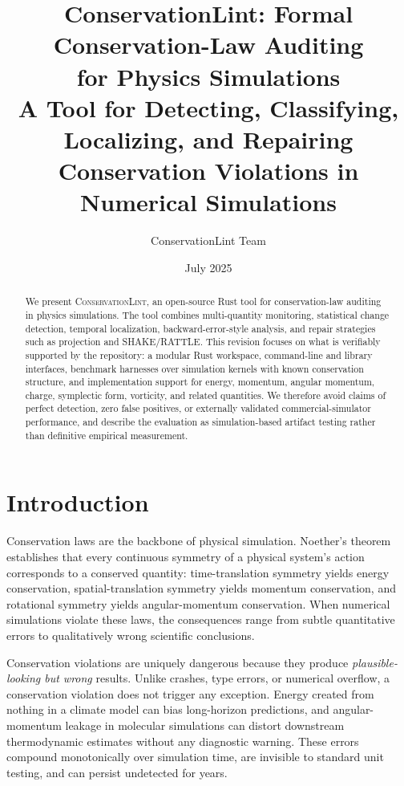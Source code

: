 \documentclass[11pt,a4paper]{article}
\title{\textbf{ConservationLint: Formal Conservation-Law Auditing\\for Physics Simulations}\\[0.5em]
\large A Tool for Detecting, Classifying, Localizing, and Repairing\\
Conservation Violations in Numerical Simulations}
\author{ConservationLint Team}
\date{July 2025}
\begin{document}
\maketitle

\begin{abstract}
We present \textsc{ConservationLint}, an open-source Rust tool for
conservation-law auditing in physics simulations.  The tool combines
multi-quantity monitoring, statistical change detection, temporal
localization, backward-error-style analysis, and repair strategies such
as projection and SHAKE/RATTLE.  This revision focuses on what is
verifiably supported by the repository: a modular Rust workspace,
command-line and library interfaces, benchmark harnesses over
simulation kernels with known conservation structure, and implementation
support for energy, momentum, angular momentum, charge, symplectic
form, vorticity, and related quantities.  We therefore avoid claims of
perfect detection, zero false positives, or externally validated
commercial-simulator performance, and describe the evaluation as
simulation-based artifact testing rather than definitive empirical
measurement.
\end{abstract}

\section{Introduction}
\label{sec:intro}

Conservation laws are the backbone of physical simulation. Noether's theorem~\citep{noether1918} establishes that every continuous symmetry of a physical system's action corresponds to a conserved quantity: time-translation symmetry yields energy conservation, spatial-translation symmetry yields momentum conservation, and rotational symmetry yields angular-momentum conservation. When numerical simulations violate these laws, the consequences range from subtle quantitative errors to qualitatively wrong scientific conclusions.

Conservation violations are uniquely dangerous because they produce \emph{plausible-looking but wrong} results. Unlike crashes, type errors, or numerical overflow, a conservation violation does not trigger any exception. Energy created from nothing in a climate model can bias long-horizon predictions, and angular-momentum leakage in molecular simulations can distort downstream thermodynamic estimates without any diagnostic warning. These errors compound monotonically over simulation time, are invisible to standard unit testing, and can persist undetected for years.
\end{document}
